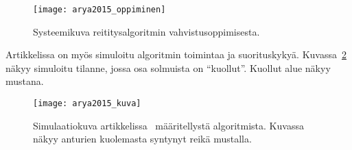 \begin{figure}[h]
  \centering
  \texttt{[image: arya2015\_oppiminen]}
  \caption{Systeemikuva reititysalgoritmin vahvistusoppimisesta.~\parencite{Arya2015}}
\label{fig:arya2015_oppiminen}
\end{figure}

Artikkelissa on myös simuloitu algoritmin toimintaa ja suorituskykyä.
Kuvassa~\ref{fig:arya2015} näkyy simuloitu tilanne, jossa osa solmuista on
``kuollut''. Kuollut alue näkyy mustana.

\begin{figure}[h]
  \centering
  \texttt{[image: arya2015\_kuva]}
  \caption{Simulaatiokuva artikkelissa~\cite{Arya2015} määritellystä
algoritmista. Kuvassa näkyy anturien kuolemasta syntynyt reikä mustalla.}
\label{fig:arya2015}
\end{figure}

